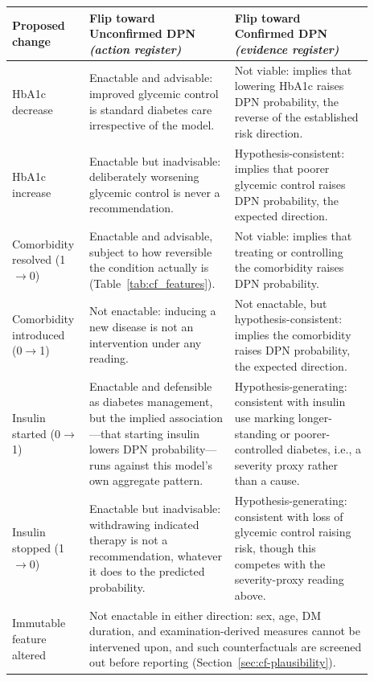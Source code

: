 \documentclass[pdflatex,sn-mathphys-num]{sn-jnl}%
\theoremstyle{thmstyleone}%
\theoremstyle{thmstyletwo}%
\theoremstyle{thmstylethree}%
\begin{document}
\begin{table}[tbp]
    \centering
    \footnotesize
    \begin{tabular}{p{0.17\linewidth} p{0.36\linewidth} p{0.36\linewidth}}
        \toprule
        \textbf{Proposed change} & \textbf{Flip toward Unconfirmed DPN} \newline \textit{(action register)} & \textbf{Flip toward Confirmed DPN} \newline \textit{(evidence register)} \\
        \midrule
        HbA1c decrease & Enactable and advisable: improved glycemic control is standard diabetes care irrespective of the model. & Not viable: implies that lowering HbA1c raises DPN probability, the reverse of the established risk direction. \\
        \midrule
        HbA1c increase & Enactable but inadvisable: deliberately worsening glycemic control is never a recommendation. & Hypothesis-consistent: implies that poorer glycemic control raises DPN probability, the expected direction. \\
        \midrule
        Comorbidity resolved (1$\to$0) & Enactable and advisable, subject to how reversible the condition actually is (Table~\ref{tab:cf_features}). & Not viable: implies that treating or controlling the comorbidity raises DPN probability. \\
        \midrule
        Comorbidity introduced (0$\to$1) & Not enactable: inducing a new disease is not an intervention under any reading. & Not enactable, but hypothesis-consistent: implies the comorbidity raises DPN probability, the expected direction. \\
        \midrule
        Insulin started (0$\to$1) & Enactable and defensible as diabetes management, but the implied association---that starting insulin lowers DPN probability---runs against this model's own aggregate pattern. & Hypothesis-generating: consistent with insulin use marking longer-standing or poorer-controlled diabetes, i.e., a severity proxy rather than a cause. \\
        \midrule
        Insulin stopped (1$\to$0) & Enactable but inadvisable: withdrawing indicated therapy is not a recommendation, whatever it does to the predicted probability. & Hypothesis-generating: consistent with loss of glycemic control raising risk, though this competes with the severity-proxy reading above. \\
        \midrule
        Immutable feature altered & \multicolumn{2}{p{0.75\linewidth}}{Not enactable in either direction: sex, age, DM duration, and examination-derived measures cannot be intervened upon, and such counterfactuals are screened out before reporting (Section~\ref{sec:cf-plausibility}).} \\

\end{tabular}
\end{table}
\end{document}
